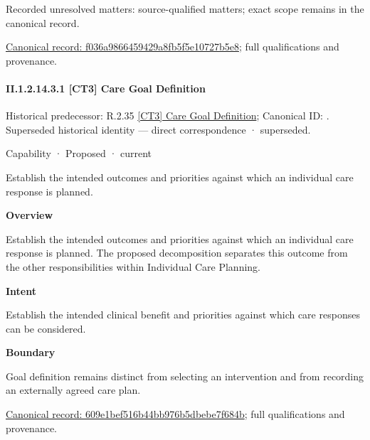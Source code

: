 {\small Recorded unresolved matters: source-qualified matters; exact scope remains in the canonical record.}\par
{\footnotesize \href{../../../../../../../continuum/strategy/capability/f036a9866459429a8fb5f5e10727b5e8.md}{Canonical record: f036a9866459429a8fb5f5e10727b5e8}; full qualifications and provenance.}\par
\paragraph*{II.1.2.14.3.1 [CT3] Care Goal Definition}
\label{navigation:II.1.2.14.3.1}

{\small Historical predecessor: R.2.35 \hyperref[element:8bfbcc0a455d423c90ae2f1cfb732ca8]{[CT3] Care Goal Definition}; Canonical ID: \texttt{}. Superseded historical identity — direct correspondence · superseded.}\par
\label{element:609e1bef516b44bb976b5dbebe7f684b}
{\small Capability · Proposed · current}\par

Establish the intended outcomes and priorities against which an individual care response is planned.



\textbf{Overview}



Establish the intended outcomes and priorities against which an individual care response is planned. The proposed decomposition separates this outcome from the other responsibilities within Individual Care Planning.



\textbf{Intent}



Establish the intended clinical benefit and priorities against which care responses can be considered.



\textbf{Boundary}



Goal definition remains distinct from selecting an intervention and from recording an externally agreed care plan.


{\footnotesize \href{../../../../../../../continuum/strategy/capability/609e1bef516b44bb976b5dbebe7f684b.md}{Canonical record: 609e1bef516b44bb976b5dbebe7f684b}; full qualifications and provenance.}\par
